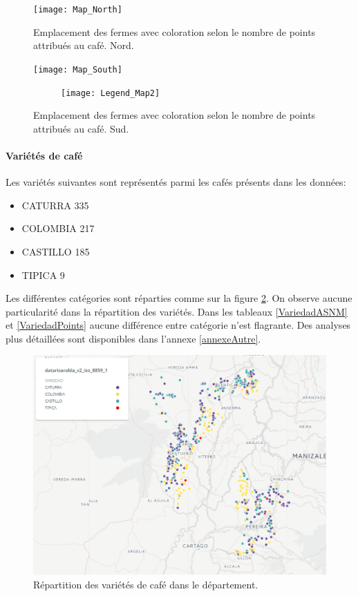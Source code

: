 \begin{figure}[H]
	\texttt{[image: Map\_North]}
	\caption{Emplacement des fermes avec coloration selon le nombre de points attribués au café. Nord.}
\end{figure}

\begin{figure}[H]
	\texttt{[image: Map\_South]}
	
	\begin{figure}[H]
		\texttt{[image: Legend\_Map2]}
	\end{figure}
	\caption{\label{FincaVSPoints} Emplacement des fermes avec coloration selon le nombre de points attribués au café. Sud.}
\end{figure}

\paragraph{Variétés de café} Les variétés suivantes sont représentés parmi les cafés présents dans les données: 
\begin{itemize}
	\item CATURRA     335
	\item COLOMBIA    217
	\item CASTILLO    185
	\item TIPICA        9
\end{itemize}

\noindent Les différentes catégories sont réparties comme sur la figure \ref{fig:variedadmap}. On observe aucune particularité dans la répartition des variétés. Dans les tableaux \ref{VariedadASNM} et \ref{VariedadPoints} aucune différence entre catégorie n'est flagrante. Des analyses plus détaillées sont disponibles dans l'annexe \ref{annexeAutre}.

\begin{figure}
	\centering
	\includegraphics[width=0.7\linewidth]{img/Exploration/VariedadMap}
	\caption{Répartition des variétés de café dans le département.}
	\label{fig:variedadmap}
\end{figure}


